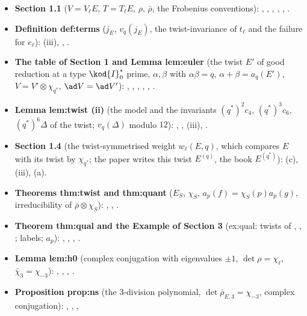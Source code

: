 \begin{itemize}
\item \textbf{Section 1.1} ($V=V_\ell E$, $T=T_\ell E$, $\rho$, $\bar\rho$, the Frobenius conventions): , , , ,
, .
\item \textbf{Definition def:terms} ($j_E$, $v_q(j_E)$, the twist-invariance of $t_\ell$ and the failure for $e_\ell$): (iii), ,
.
\item \textbf{The table of Section 1 and Lemma lem:euler} (the twist $E'$ of good reduction at a type $\kod{I}_0^*$ prime, $\alpha,\beta$ with $\alpha\beta=q$, $\alpha+\beta=a_q(E')$, $V=V'\otimes\chi_{q^*}$, $\ad V=\ad V'$):
, , , , , .
\item \textbf{Lemma lem:twist (ii)} (the model and the invariants $(q^*)^2c_4$, $(q^*)^3c_6$, $(q^*)^6\Delta$ of the twist; $v_q(\Delta)$ modulo $12$): , ,
(iii), .
\item \textbf{Section 1.4} (the twist-symmetrised weight $w_\ell(E,q)$, which compares $E$ with its twist by $\chi_{q^*}$; the paper writes this twist $E^{(q)}$, the book
$E^{(q^*)}$): (c), (iii), (a).
\item \textbf{Theorems thm:twist and thm:quant} ($E_S$, $\chi_S$, $a_p(f)=\chi_S(p)a_p(g)$, irreducibility of $\bar\rho\otimes\chi_S$): , ,
.
\item \textbf{Theorem thm:qual and the Example of Section 3} (ex:qual: twists of , , ; labels; $a_p$): , ,
, .
\item \textbf{Lemma lem:h0} (complex conjugation with eigenvalues $\pm1$, $\det\rho=\chi_\ell$, $\bar\chi_3=\chi_{-3}$): , ,
, .
\item \textbf{Proposition prop:ns} (the $3$-division polynomial, $\det\bar\rho_{E,3}=\chi_{-3}$, complex conjugation): , , ,

\end{itemize}
